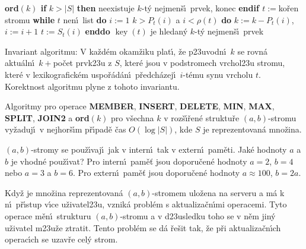 \documentclass[a4paper,12pt]{article}
\DeclareMathOperator*{\key}{key}
\begin{document}
{\bf ord$(k)$\newline 
if} $k>|S|$ {\bf then} neexistuje $k$-t\'y nejmen\v s\'\i\ prvek, konec 
{\bf endif\newline 
$t:=$}ko\v ren stromu\newline 
{\bf while} $t$ nen\'\i\ list {\bf do}\newline 
\phantom{---}$i:=1$\newline 
\phantom{---}{\bf while} $k>P_t(i)$ a $i<\rho (t)$ {\bf do}\newline 
\phantom{------}$k:=k-P_t(i)$, $i:=i+1$\newline 
\phantom{---}{\bf enddo}\newline 
\phantom{---}$t:=S_t(i)$\newline 
{\bf enddo}\newline 
$\key(t)$ je hledan\'y $k$-t\'y nejmen\v s\'\i\ prvek
\bigskip

\flushpar Invariant algoritmu: V ka\v zd\'em okam\v ziku plat\'\i , 
\v ze p\accent23uvodn\'\i\ $k$ se rovn\'a aktu\'aln\'\i\ $k+$po\v cet prvk\accent23u z 
$S$, kter\'e jsou v podstromech vrchol\accent23u stromu, kter\'e v 
lexikografick\'em uspo\v r\'ad\'an\'\i\ p\v redch\'azej\'\i\ $i$-t\'emu synu 
vrcholu $t$. Korektnost algoritmu plyne z tohoto 
invariantu.


Algoritmy pro operace {\bf MEMBER}, {\bf INSERT}, 
{\bf DE\-LETE}, {\bf MIN}, {\bf MAX}, {\bf SPLIT}, {\bf JOIN2} a {\bf ord$
(k)$} pro v\v sechna $k$ v 
roz\v s\'\i\v ren\'e struktu\v re $(a,b)$-stromu vy\-\v za\-duj\'\i\ v 
nejhor\v s\'\i m p\v r\'\i\-pa\-d\v e \v cas $O(\log|S|)$, kde $S$ je reprezentovan\'a 
mno\v zina.  
\endproclaim


\flushpar $(a,b)$-stromy se pou\v z\'\i vaj\'\i\ jak v intern\'\i\ tak v 
extern\'\i\ pam\v eti. Jak\'e hodnoty $a$ a $b$ je vhodn\'e 
pou\v z\'\i vat?\newline 
Pro intern\'\i\ pam\v e\v t jsou doporu\v cen\'e hodnoty $a=2$, $
b=4$ 
nebo $a=3$ a $b=6$.\newline 
Pro extern\'\i\ pam\v e\v t jsou doporu\v cen\'e hodnoty $a\approx 
100$, 
$b=2a$.
\medskip

\flushpar Kdy\v z je mno\v zina reprezentovan\'a $(a,b)$-stromem 
ulo\v zena na serveru a m\'a k n\'\i\ p\v r\'\i stup v\'\i ce 
u\v zivatel\accent23u, vznik\'a probl\'em s aktualiza\v cn\'\i mi 
operacemi. Tyto operace m\v en\'\i\ strukturu $(a,b)$-stromu a 
v d\accent23usledku toho se v n\v em jin\'y u\v zivatel 
m\accent23u\v ze ztratit. Tento probl\'em se d\'a  
\v re\v sit tak, \v ze p\v ri aktu\-aliza\v cn\'\i ch operac\'\i ch 
se uzav\v re cel\'y strom.
\medskip 
\end{document}
